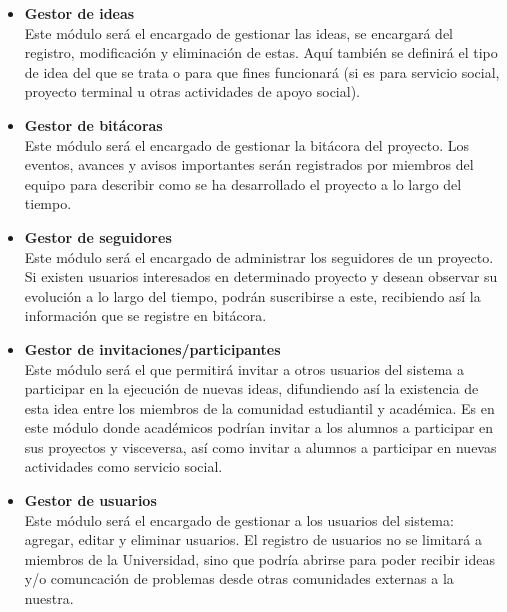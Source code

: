 \documentclass[11pt,letterpaper,titlepage]{article}
\begin{document}
\begin{itemize}

\item \textbf{Gestor de ideas}\\
Este m\'odulo ser\'a el encargado de gestionar las ideas, se encargar\'a del registro, modificaci\'on y eliminaci\'on de estas. Aqu\'i tambi\'en se definir\'a el tipo de idea del que se trata o para que fines funcionar\'a (si es para servicio social, proyecto terminal u otras actividades de apoyo social).

 \item \textbf{Gestor de bit\'acoras}\\
Este m\'odulo ser\'a el encargado de gestionar la bit\'acora del proyecto. Los eventos, avances y avisos importantes ser\'an registrados por miembros del equipo para describir como se ha desarrollado el proyecto a lo largo del tiempo.

 \item \textbf{Gestor de seguidores}\\
Este m\'odulo ser\'a el encargado de administrar los seguidores de un proyecto. Si existen usuarios interesados en determinado proyecto y desean observar su evoluci\'on a lo largo del tiempo, podr\'an suscribirse a este, recibiendo as\'i la informaci\'on que se registre en bit\'acora.

 \item \textbf{Gestor de invitaciones/participantes}\\
Este m\'odulo ser\'a el que permitir\'a invitar a otros usuarios del sistema a participar en la ejecuci\'on de nuevas ideas, difundiendo as\'i la existencia de esta idea entre los miembros de la comunidad estudiantil y acad\'emica. Es en este m\'odulo donde acad\'emicos podr\'ian invitar a los alumnos a participar en sus proyectos y visceversa, as\'i como invitar a alumnos a participar en nuevas actividades como servicio social.



 \item \textbf{Gestor de usuarios}\\
Este m\'odulo ser\'a el encargado de gestionar a los usuarios del sistema: agregar, editar y eliminar usuarios. El registro de usuarios no se limitar\'a a miembros de la Universidad, sino que podr\'ia abrirse para poder recibir ideas y/o comuncaci\'on de problemas desde otras comunidades externas a la nuestra.


\end{itemize}
\end{document}
